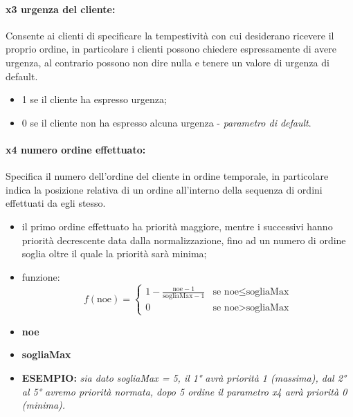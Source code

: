 \paragraph{x3 urgenza del cliente:}
Consente ai clienti di specificare la tempestività con cui desiderano ricevere il proprio ordine, in particolare i clienti possono chiedere espressamente di avere urgenza, al contrario possono non dire nulla e tenere un valore di urgenza di default.
\begin{itemize}
	\item 1 se il cliente ha espresso urgenza;
	\item 0 se il cliente non ha espresso alcuna urgenza - \textit{parametro di default}.
\end{itemize}

\paragraph{x4 numero ordine effettuato:}
Specifica il numero dell’ordine del cliente in ordine temporale, in particolare indica la posizione relativa di un ordine all'interno della sequenza di ordini effettuati da egli stesso.
\begin{itemize}
	
	\item il primo ordine effettuato ha priorità maggiore, mentre i successivi hanno priorità decrescente data dalla normalizzazione, fino ad un numero di ordine soglia oltre il quale la priorità sarà minima;
	
	\item funzione: \[f(\text{noe}) = \begin{cases} 1 -  \frac{{\text{noe} - 1}}{{\text{sogliaMax} - 1}} & \text{se } \text{noe} \leq \text{sogliaMax} \\ 0 & \text{se } \text{noe} > \text{sogliaMax} \end{cases} \]
	
	
	\item \textbf{noe} 
	\item \textbf{sogliaMax} 
	\item \textbf{ESEMPIO: } \textit{sia dato sogliaMax = 5, il 1° avrà priorità 1 (massima), dal 2° al 5° avremo priorità normata, dopo 5 ordine il parametro x4 avrà priorità 0 (minima).}
\end{itemize}

